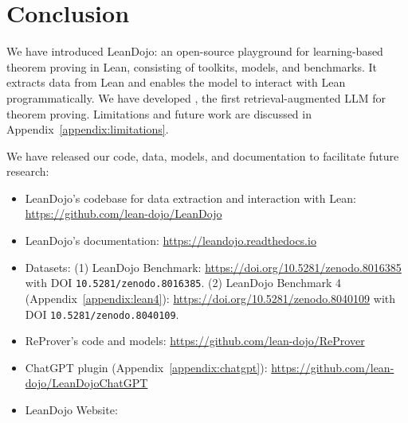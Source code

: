\section{Conclusion}
We have introduced LeanDojo: an open-source playground for learning-based theorem proving in Lean, consisting of toolkits, models, and benchmarks. It extracts data from Lean and enables the model to interact with Lean programmatically. We have developed {\name}, the first retrieval-augmented LLM for theorem proving. Limitations and future work are discussed in Appendix~\ref{appendix:limitations}.

We have released our code, data, models, and documentation to facilitate future research:

\begin{itemize}
    \item LeanDojo's codebase for data extraction and interaction with Lean: \url{https://github.com/lean-dojo/LeanDojo}
    \item LeanDojo's documentation: \url{https://leandojo.readthedocs.io}
    \item Datasets: (1) LeanDojo Benchmark: \url{https://doi.org/10.5281/zenodo.8016385} with DOI \texttt{10.5281/zenodo.8016385}. (2) LeanDojo Benchmark 4 (Appendix~\ref{appendix:lean4}): \url{https://doi.org/10.5281/zenodo.8040109} with DOI \texttt{10.5281/zenodo.8040109}.
    \item ReProver's code and models: \url{https://github.com/lean-dojo/ReProver}
    \item ChatGPT plugin (Appendix~\ref{appendix:chatgpt}): \url{https://github.com/lean-dojo/LeanDojoChatGPT}
    \item LeanDojo Website: \weburl
\end{itemize}
